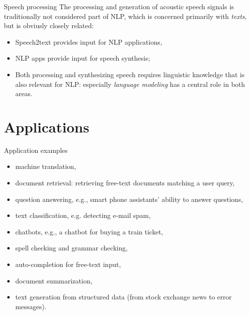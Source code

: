 \documentclass[style=upen, size=14pt]{powerdot}
\newcommand{\gold}{\color{arany}}
\begin{document}
\begin{slide}[toc=Speech processing]{Speech processing}
  The processing and generation of acoustic speech signals is traditionally not
  considered part of NLP, which is concerned primarily with \emph{texts}, but is
  obviusly closely related:\pause
    
  \begin{itemize}
  \item Speech2text provides input for NLP applications,\pause
  \item NLP apps provide input for speech synthesis;\pause
  \item Both processing and synthesizing speech requires linguistic knowledge
    that is also relevant for NLP: especially \emph{language modeling} has a
    central role in both areas.
  \end{itemize}
\end{slide}


\section{Applications}

\begin{slide}[toc=Examples]{Application examples}
  \begin{itemize}
  \item {\gold machine translation},\pause
  \item {\gold document retrieval}: retrieving free-text documents matching a
    user query,\pause
  \item {\gold question answering}, e.g., smart phone assistants'
    ability to answer questions,\pause
  \item {\gold text classification}, e.g. detecting e-mail spam,\pause
  \item {\gold chatbots}, e.g., a chatbot for buying a train ticket,\pause
  \item {\gold spell checking} and {\gold grammar checking},\pause
  \item {\gold auto-completion} for free-text input,\pause
  \item {\gold document summarization},\pause
  \item {\gold text generation} from structured data (from stock exchange news
    to error messages).
  \end{itemize}
\end{slide}
\end{document}
